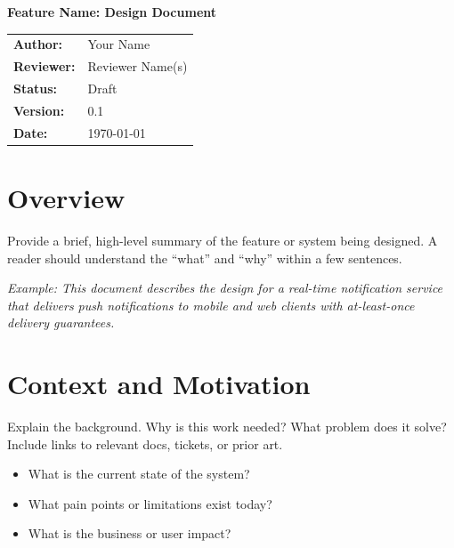 \documentclass[11pt, a4paper]{article}
\newcommand{\doctitle}{Feature Name: Design Document}
\newcommand{\docauthor}{Your Name}
\newcommand{\docreviewer}{Reviewer Name(s)}
\newcommand{\docstatus}{Draft}           %
\newcommand{\docversion}{0.1}
\begin{document}
\begin{center}
    {\LARGE\bfseries \doctitle \par}
    \vspace{1em}
    \begin{tabular}{@{} l l @{}}
        \textbf{Author:}   & \docauthor \\
        \textbf{Reviewer:} & \docreviewer \\
        \textbf{Status:}   & \docstatus \\
        \textbf{Version:}  & \docversion \\
        \textbf{Date:}     & \today \\
    \end{tabular}
\end{center}

\vspace{1em}
\tableofcontents
\newpage

\section{Overview}

Provide a brief, high-level summary of the feature or system being designed. A reader should understand the ``what'' and ``why'' within a few sentences.

\textit{Example: This document describes the design for a real-time notification service that delivers push notifications to mobile and web clients with at-least-once delivery guarantees.}

\section{Context and Motivation}

Explain the background. Why is this work needed? What problem does it solve? Include links to relevant docs, tickets, or prior art.

\begin{itemize}
    \item What is the current state of the system?
    \item What pain points or limitations exist today?
    \item What is the business or user impact?
\end{itemize}
\end{document}
